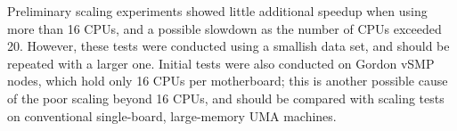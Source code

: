 Preliminary scaling experiments showed little additional speedup when
using more than 16 CPUs, and a possible slowdown as the number of CPUs
exceeded 20.  However, these tests were conducted using a smallish
data set, and should be repeated with a larger one.  Initial tests
were also conducted on Gordon vSMP nodes, which hold only 16 CPUs per
motherboard; this is another possible cause of the poor scaling beyond
16 CPUs, and should be compared with scaling tests on conventional
single-board, large-memory UMA machines.
